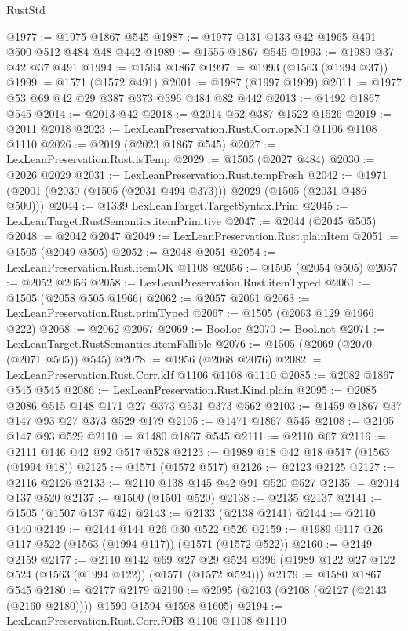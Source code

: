 \begin{lexlean}{RustStd}
\begin{coremodule}
@1977 := @1975 @1867 @545
@1987 := @1977 @131 @133 @42 @1965 @491 @500 @512 @484 @48 @442
@1989 := @1555 @1867 @545
@1993 := @1989 @37 @42 @37 @491
@1994 := @1564 @1867
@1997 := @1993 (@1563 (@1994 @37))
@1999 := @1571 (@1572 @491)
@2001 := @1987 (@1997 @1999)
@2011 := @1977 @53 @69 @42 @29 @387 @373 @396 @484 @82 @442
@2013 := @1492 @1867 @545
@2014 := @2013 @42
@2018 := @2014 @52 @387 @1522 @1526
@2019 := @2011 @2018
@2023 := LexLeanPreservation.Rust.Corr.opsNil @1106 @1108 @1110
@2026 := @2019 (@2023 @1867 @545)
@2027 := LexLeanPreservation.Rust.isTemp
@2029 := @1505 (@2027 @484)
@2030 := @2026 @2029
@2031 := LexLeanPreservation.Rust.tempFresh
@2042 := @1971 (@2001 (@2030 (@1505 (@2031 @494 @373))) @2029 (@1505 (@2031 @486 @500)))
@2044 := @1339 LexLeanTarget.TargetSyntax.Prim
@2045 := LexLeanTarget.RustSemantics.itemPrimitive
@2047 := @2044 (@2045 @505)
@2048 := @2042 @2047
@2049 := LexLeanPreservation.Rust.plainItem
@2051 := @1505 (@2049 @505)
@2052 := @2048 @2051
@2054 := LexLeanPreservation.Rust.itemOK @1108
@2056 := @1505 (@2054 @505)
@2057 := @2052 @2056
@2058 := LexLeanPreservation.Rust.itemTyped
@2061 := @1505 (@2058 @505 @1966)
@2062 := @2057 @2061
@2063 := LexLeanPreservation.Rust.primTyped
@2067 := @1505 (@2063 @129 @1966 @222)
@2068 := @2062 @2067
@2069 := Bool.or
@2070 := Bool.not
@2071 := LexLeanTarget.RustSemantics.itemFallible
@2076 := @1505 (@2069 (@2070 (@2071 @505)) @545)
@2078 := @1956 (@2068 @2076)
@2082 := LexLeanPreservation.Rust.Corr.kIf @1106 @1108 @1110
@2085 := @2082 @1867 @545 @545
@2086 := LexLeanPreservation.Rust.Kind.plain
@2095 := @2085 @2086 @515 @148 @171 @27 @373 @531 @373 @562
@2103 := @1459 @1867 @37 @147 @93 @27 @373 @529 @179
@2105 := @1471 @1867 @545
@2108 := @2105 @147 @93 @529
@2110 := @1480 @1867 @545
@2111 := @2110 @67
@2116 := @2111 @146 @42 @92 @517 @528
@2123 := @1989 @18 @42 @18 @517 (@1563 (@1994 @18))
@2125 := @1571 (@1572 @517)
@2126 := @2123 @2125
@2127 := @2116 @2126
@2133 := @2110 @138 @145 @42 @91 @520 @527
@2135 := @2014 @137 @520
@2137 := @1500 (@1501 @520)
@2138 := @2135 @2137
@2141 := @1505 (@1507 @137 @42)
@2143 := @2133 (@2138 @2141)
@2144 := @2110 @140
@2149 := @2144 @144 @26 @30 @522 @526
@2159 := @1989 @117 @26 @117 @522 (@1563 (@1994 @117)) (@1571 (@1572 @522))
@2160 := @2149 @2159
@2177 := @2110
    @142
    @69
    @27
    @29
    @524
    @396
    (@1989 @122 @27 @122 @524 (@1563 (@1994 @122)) (@1571 (@1572 @524)))
@2179 := @1580 @1867 @545
@2180 := @2177 @2179
@2190 := @2095 (@2103 (@2108 (@2127 (@2143 (@2160 @2180)))) @1590 @1594 @1598 @1605)
@2194 := LexLeanPreservation.Rust.Corr.fOfB @1106 @1108 @1110

\end{coremodule}
\end{lexlean}
